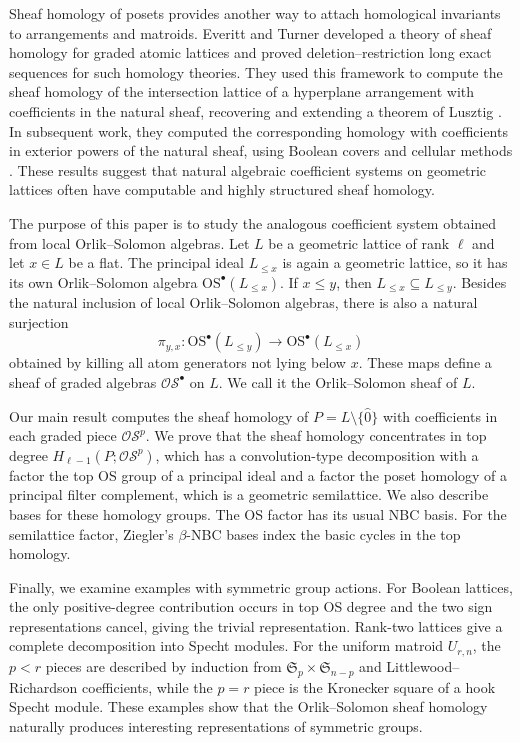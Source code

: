 \documentclass{amsart}
\numberwithin{equation}{section}
\theoremstyle{plain}
\theoremstyle{remark}
\theoremstyle{definition}
\numberwithin{equation}{section}
\newcommand{\OS}{\mathrm{OS}}
\newcommand{\sOS}{\mathscr{OS}}
\begin{document}
Sheaf homology of posets provides another way to attach homological invariants to arrangements and matroids.  Everitt and Turner developed a theory of sheaf homology for graded atomic lattices and proved deletion--restriction long exact sequences for such homology theories.  They used this framework to compute the sheaf homology of the intersection lattice of a hyperplane arrangement with coefficients in the natural sheaf, recovering and extending a theorem of Lusztig \cite{Everitt2022}.  In subsequent work, they computed the corresponding homology with coefficients in exterior powers of the natural sheaf, using Boolean covers and cellular methods \cite{Everitt2022a}.  These results suggest that natural algebraic coefficient systems on geometric lattices often have computable and highly structured sheaf homology.

The purpose of this paper is to study the analogous coefficient system obtained from local Orlik--Solomon algebras.  Let $L$ be a geometric lattice of rank $\ell$ and let $x\in L$ be a flat.  The principal ideal $L_{\leq x}$ is again a geometric lattice, so it has its own Orlik--Solomon algebra $\OS^\bullet(L_{\leq x})$.  If $x\leq y$, then $L_{\leq x}\subseteq L_{\leq y}$.  Besides the natural inclusion of local Orlik--Solomon algebras, there is also a natural surjection
\[
\pi_{y,x}:\OS^\bullet(L_{\leq y})\longrightarrow \OS^\bullet(L_{\leq x})
\]
obtained by killing all atom generators not lying below $x$.  These maps define a sheaf of graded algebras $\sOS^\bullet$ on $L$.  We call it the Orlik--Solomon sheaf of $L$.

Our main result computes the sheaf homology of $P=L\setminus\{\hat0\}$ with coefficients in each graded piece $\sOS^p$. We prove that the sheaf homology concentrates in top degree $H_{\ell-1}(P;\sOS^p)$, which has a convolution-type decomposition with a factor the top OS group of a principal ideal and a factor the poset homology of a principal filter complement, which is a geometric semilattice.
We also describe bases for these homology groups.  The OS factor has its usual NBC basis.  For the semilattice factor, Ziegler's $\beta$-NBC bases index the basic cycles in the top homology.

Finally, we examine examples with symmetric group actions.  For Boolean lattices, the only positive-degree contribution occurs in top OS degree and the two sign representations cancel, giving the trivial representation.  Rank-two lattices give a complete decomposition into Specht modules.  For the uniform matroid $U_{r,n}$, the $p<r$ pieces are described by induction from $\mathfrak S_p\times\mathfrak S_{n-p}$ and Littlewood--Richardson coefficients, while the $p=r$ piece is the Kronecker square of a hook Specht module.  These examples show that the Orlik--Solomon sheaf homology naturally produces interesting representations of symmetric groups.
\end{document}
